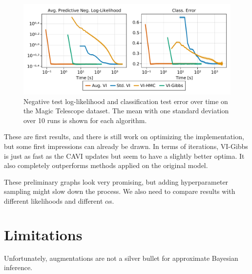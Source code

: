 \begin{figure}[H]
    \centering
    \includegraphics[width=\textwidth]{./chapters/8_discussions/figures/magictelescope.pdf}
    \caption{Negative test log-likelihood and classification test error over time on the Magic Telescope dataset.
    The mean with one standard deviation over 10 runs is shown for each algorithm.
    }
    \label{fig:magictelescope}
\end{figure}

These are first results, and there is still work on optimizing the implementation, but some first impressions can already be drawn.
In terms of iterations, VI-Gibbs is just as fast as the \ac{CAVI} updates but seem to have a slightly better optima.
It also completely outperforms methods applied on the original model.

These preliminary graphs look very promising, but adding hyperparameter sampling might slow down the process.
We also need to compare results with different likelihoods and different $\alpha$s.



\section{Limitations}

Unfortunately, augmentations are not a silver bullet for approximate Bayesian inference.
